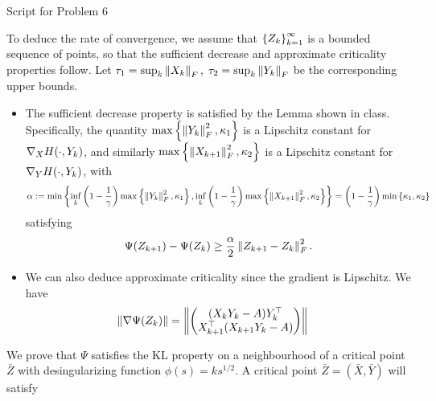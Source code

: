 \documentclass[10pt]{article}
\begin{document}
\begin{longlisting} \label{p6code}
	\inputminted{python}{hw2_p6.py}
	\caption{Script for Problem 6}
\end{longlisting}

To deduce the rate of convergence, we assume that $\left\{ Z_k \right\}_{k=1}^{\infty}$ is
a bounded sequence of points, so that the sufficient decrease and approximate
criticality properties follow. Let $\tau_1 = \sup_{k} \left \| X_k \right \|_F, \;
\tau_2 = \sup_{k} \left \| Y_k \right \|_F$ be the corresponding upper bounds.
\begin{itemize}
\item The sufficient decrease property is satisfied by the Lemma shown in class.
Specifically, the quantity $\max\left\{ \left \| Y_k \right \|_F^2, \kappa_1 \right\}$ is a
Lipschitz constant for $\nabla_X H(\cdot, Y_k)$, and similarly $
\max\left\{ \left \| X_{k+1} \right \|_F^2, \kappa_2 \right\}$ is a Lipschitz constant for $\nabla_Y
H(\cdot, Y_k)$, with
\[
    \alpha := \min\left\{ \inf_k \left(1 - \frac{1}{\gamma}\right)
        \max\left\{ \left \| Y_k \right \|_F^2, \kappa_1 \right\},
        \inf_k \left(1 - \frac{1}{\gamma}\right)
        \max\left\{ \left \| X_{k+1} \right \|_F^2, \kappa_2 \right\} \right\} =
   \left(1 - \frac{1}{\gamma}\right) \min \left\{ \kappa_1, \kappa_2 \right\}
\]
satisfying
\[
    \Psi(Z_{k+1}) - \Psi(Z_k) \geq \frac{\alpha}{2}
    \left \| Z_{k+1} - Z_k \right \|^2_F.
\]
\item We can also deduce approximate criticality since the gradient is
Lipschitz. We have
\begin{align*}
    \left \| \nabla \Psi(Z_k) \right \| &= \left \| \begin{pmatrix} 
        (X_k Y_k - A) Y_k^\top \\
        X_{k+1}^\top (X_{k+1} Y_k - A)
     \end{pmatrix} \right \|
\end{align*}
\end{itemize}
\newcommand{\Xbar}{\bar{X}}
\newcommand{\Ybar}{\bar{Y}}
\newcommand{\Zbar}{\bar{Z}}
We prove that $\Psi$ satisfies the KL property on a neighbourhood of a
critical point $\bar{Z}$ with desingularizing function $\phi(s) = ks^{1/2}$.
A critical point $\bar{Z} = (\Xbar, \Ybar)$ will satisfy
\end{document}
